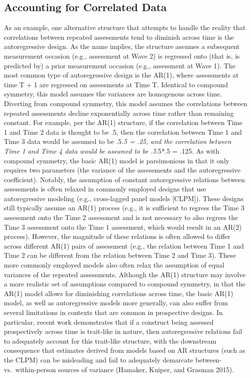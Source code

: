 \documentclass[
  letterpaper,
  DIV=11,
  numbers=noendperiod]{scrartcl}
\begin{document}
\hypertarget{accounting-for-correlated-data}{%
\subsection{Accounting for Correlated
Data}\label{accounting-for-correlated-data}}

As an example, one alternative structure that attempts to handle the
reality that correlations between repeated assessments tend to diminish
across time is the autoregressive design. As the name implies, the
structure assumes a subsequent measurement occasion (e.g., assessment at
Wave 2) is regressed onto (that is, is predicted by) a prior measurement
occasion (e.g., assessment at Wave 1). The most common type of
autoregressive design is the AR(1), where assessments at time T + 1 are
regressed on assessments at Time T. Identical to compound symmetry, this
model assumes the variances are homogenous across time. Diverting from
compound symmetry, this model assumes the correlations between repeated
assessments decline exponentially across time rather than remaining
constant. For example, per the AR(1) structure, if the correlation
between Time 1 and Time 2 data is thought to be .5, then the correlation
between Time 1 and Time 3 data would be assumed to be .5\emph{.5 = .25,
and the correlation between Time 1 and Time 4 data would be assumed to
be .5}.5*.5 = .125. As with compound symmetry, the basic AR(1) model is
parsimonious in that it only requires two parameters (the variance of
the assessments and the autoregressive coefficient). Notably, the
assumption of constant autoregressive relations between assessments is
often relaxed in commonly employed designs that use autoregressive
modeling (e.g., cross-lagged panel models {[}CLPM{]}). These designs
still typically assume an AR(1) process (e.g., it is sufficient to
regress the Time 3 assessment onto the Time 2 assessment and is not
necessary to also regress the Time 3 assessment onto the Time 1
assessment, which would result in an AR(2) process). However, the
magnitude of these relations is often allowed to differ across different
AR(1) pairs of assessment (e.g., the relation between Time 1 and Time 2
can be different from the relation between Time 2 and Time 3). These
more commonly employed models also often relax the assumption of equal
variances of the repeated assessments. Although the AR(1) structure may
involve a more realistic set of assumptions compared to compound
symmetry, in that the AR(1) model allows for diminishing correlations
across time, the basic AR(1) model, as well as autoregressive models
more generally, can also suffer from several limitations in contexts
that are common in prospective designs. In particular, recent work
demonstrates that if a construct being assessed prospectively across
time is trait-like in nature, then autoregressive relations fail to
adequately account for this trait-like structure, with the downstream
consequence that estimates derived from models based on AR structures
(such as the CLPM) can be misleading and fail to adequately demarcate
between- vs.~within-person sources of variance (Hamaker, Kuiper, and
Grasman 2015).
\end{document}
